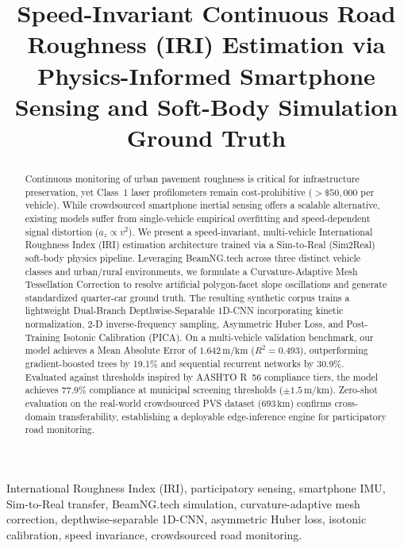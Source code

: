 \documentclass[conference]{IEEEtran}
\begin{document}
\title{Speed-Invariant Continuous Road Roughness (IRI) Estimation via Physics-Informed Smartphone Sensing and Soft-Body Simulation Ground Truth}

\author{
}

\maketitle

\begin{abstract}
Continuous monitoring of urban pavement roughness is critical for infrastructure preservation, yet Class~1 laser profilometers remain cost-prohibitive ($>\$50{,}000$ per vehicle). While crowdsourced smartphone inertial sensing offers a scalable alternative, existing models suffer from single-vehicle empirical overfitting and speed-dependent signal distortion ($a_z \propto v^2$). We present a speed-invariant, multi-vehicle International Roughness Index (IRI) estimation architecture trained via a Sim-to-Real (Sim2Real) soft-body physics pipeline. Leveraging BeamNG.tech across three distinct vehicle classes and urban/rural environments, we formulate a Curvature-Adaptive Mesh Tessellation Correction to resolve artificial polygon-facet slope oscillations and generate standardized quarter-car ground truth. The resulting synthetic corpus trains a lightweight Dual-Branch Depthwise-Separable 1D-CNN incorporating kinetic normalization, 2-D inverse-frequency sampling, Asymmetric Huber Loss, and Post-Training Isotonic Calibration (PICA). On a multi-vehicle validation benchmark, our model achieves a Mean Absolute Error of $1.642\,\text{m/km}$ ($R^2 = 0.493$), outperforming gradient-boosted trees by 19.1\% and sequential recurrent networks by 30.9\%. Evaluated against thresholds inspired by AASHTO R~56 compliance tiers, the model achieves 77.9\% compliance at municipal screening thresholds ($\pm 1.5\,\text{m/km}$). Zero-shot evaluation on the real-world crowdsourced PVS dataset ($693\,\text{km}$) confirms cross-domain transferability, establishing a deployable edge-inference engine for participatory road monitoring.
\end{abstract}

\begin{IEEEkeywords}
International Roughness Index (IRI), participatory sensing, smartphone IMU, Sim-to-Real transfer, BeamNG.tech simulation, curvature-adaptive mesh correction, depthwise-separable 1D-CNN, asymmetric Huber loss, isotonic calibration, speed invariance, crowdsourced road monitoring.
\end{IEEEkeywords}
\end{document}

